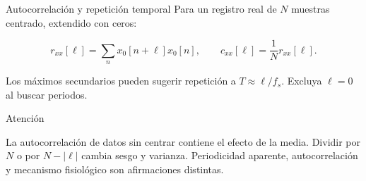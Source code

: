 \documentclass[
  10pt,
  ignorenonframetext,
  aspectratio=169,
  spanish,
]{beamer}
\begin{document}
\begin{frame}{Autocorrelación y repetición temporal}
\label{d1-066}
Para un registro real de \(N\) muestras centrado, extendido con ceros:

\[r_{xx}[\ell]=\sum_nx_0[n+\ell]x_0[n],\qquad
c_{xx}[\ell]=\frac1N r_{xx}[\ell].\]

Los máximos secundarios pueden sugerir repetición a
\(T\approx\ell/f_s\). Excluya \(\ell=0\) al buscar periodos.

\begin{alertblock}{Atención}

La autocorrelación de datos sin centrar contiene el efecto de la media.
Dividir por \(N\) o por \(N-|\ell|\) cambia sesgo y varianza.
Periodicidad aparente, autocorrelación y mecanismo fisiológico son
afirmaciones distintas.

\end{alertblock}

\end{frame}
\end{document}

